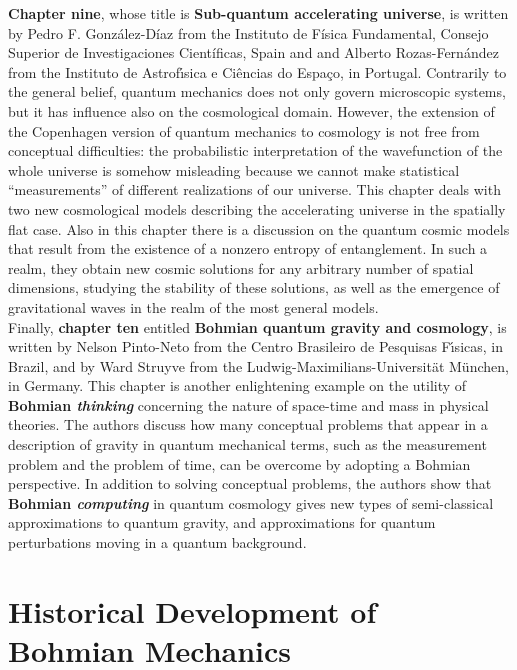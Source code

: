 \documentclass[nofootinbib, secnumarabic, amsmath, nobibnotes,11pt,aps,pra, floatfix]{revtex4-1}
\begin{document}
\textbf{Chapter nine}, whose title is \textbf{Sub-quantum accelerating universe}, is written by Pedro F. Gonz\'alez-D\'{i}az from the Instituto de F\'isica Fundamental, Consejo Superior de Investigaciones Cient\'ificas, Spain and and Alberto Rozas-Fern\'andez from the Instituto de Astrof\'{\i}sica e Ci\^{e}ncias do Espa\c{c}o, in Portugal. Contrarily to the general belief, quantum mechanics does not only govern microscopic systems, but it has influence also on the cosmological domain. However, the extension of the Copenhagen version of quantum mechanics to cosmology is not free from conceptual difficulties: the probabilistic interpretation of the wavefunction of the whole universe is somehow misleading because we cannot make statistical ``measurements'' of different realizations of our universe. This chapter deals with two new cosmological models describing the accelerating universe in the spatially flat case.  Also in this chapter there is a discussion on the quantum cosmic models that result from the existence of a nonzero entropy of entanglement. In such a realm, they obtain new cosmic solutions for any arbitrary number of spatial dimensions, studying the stability of these solutions, as well as the emergence of gravitational waves in the realm of the most general models. \\

Finally, \textbf{chapter ten} entitled \textbf{Bohmian quantum gravity and cosmology}, is written by Nelson Pinto-Neto from the Centro Brasileiro de Pesquisas F\'{\i}sicas, in Brazil, and by Ward Struyve from the Ludwig-Maximilians-Universit\"at M\"unchen, in Germany. This chapter is another enlightening example on the utility of \textbf{Bohmian \emph{thinking}} concerning the nature of space-time and mass in physical theories. The authors discuss how many conceptual problems that appear in a description of gravity in quantum mechanical terms, such as the measurement problem and the problem of time, can be overcome by adopting a Bohmian perspective.  In addition to solving conceptual problems, the authors show that \textbf{Bohmian \emph{computing}} in quantum cosmology gives new types of semi-classical approximations to quantum gravity, and approximations for quantum perturbations moving in a quantum background. \\


\section{Historical Development of Bohmian Mechanics}\label{om.sec_intro}
\end{document}

